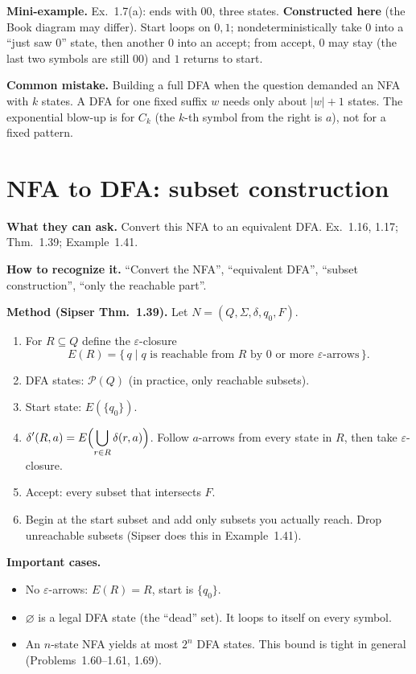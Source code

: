 \documentclass[11pt,a4paper]{article}
\newcommand{\eps}{\varepsilon}
\newcommand{\powerset}[1]{\mathcal{P}(#1)}
\begin{document}
\textbf{Mini-example.}
Ex.~1.7(a): ends with $00$, three states. \textbf{Constructed here}
(the Book diagram may differ). Start loops on $0,1$;
nondeterministically take $0$ into a ``just saw $0$'' state, then
another $0$ into an accept; from accept, $0$ may stay (the last two
symbols are still $00$) and $1$ returns to start.

\textbf{Common mistake.}
Building a full DFA when the question demanded an NFA with $k$
states. A DFA for one fixed suffix $w$ needs only about $|w|+1$
states. The exponential blow-up is for $C_k$ (the $k$-th symbol
from the right is $a$), not for a fixed pattern.

\section{NFA to DFA: subset construction}
\label{type:subset}

\textbf{What they can ask.}
Convert this NFA to an equivalent DFA. Ex.~1.16, 1.17; Thm.~1.39;
Example~1.41.

\textbf{How to recognize it.}
``Convert the NFA'', ``equivalent DFA'', ``subset construction'',
``only the reachable part''.

\textbf{Method (Sipser Thm.~1.39).}
Let $N=(Q,\Sigma,\delta,q_0,F)$.
\begin{enumerate}
  \item For $R\subseteq Q$ define the $\eps$-closure
        \[
          E(R)=\{\,q\mid q\text{ is reachable from $R$ by $0$ or more
          $\eps$-arrows}\,\}.
        \]
  \item DFA states: $\powerset{Q}$ (in practice, only reachable
        subsets).
  \item Start state: $E(\{q_0\})$.
  \item $\displaystyle\delta'(R,a)=E\Bigl(\bigcup_{r\in R}\delta(r,a)\Bigr)$.
        Follow $a$-arrows from every state in $R$, then take
        $\eps$-closure.
  \item Accept: every subset that intersects $F$.
  \item Begin at the start subset and add only subsets you actually
        reach. Drop unreachable subsets (Sipser does this in
        Example~1.41).
\end{enumerate}

\textbf{Important cases.}
\begin{itemize}[nosep]
  \item No $\eps$-arrows: $E(R)=R$, start is $\{q_0\}$.
  \item $\varnothing$ is a legal DFA state (the ``dead'' set). It
        loops to itself on every symbol.
  \item An $n$-state NFA yields at most $2^n$ DFA states. This bound
        is tight in general (Problems~1.60--1.61, 1.69).
\end{itemize}
\end{document}
